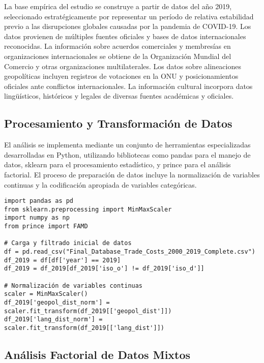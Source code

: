 \documentclass[11pt,a4paper]{article}
\begin{document}
La base empírica del estudio se construye a partir de datos del año 2019, seleccionado estratégicamente por representar un período de relativa estabilidad previo a las disrupciones globales causadas por la pandemia de COVID-19. Los datos provienen de múltiples fuentes oficiales y bases de datos internacionales reconocidas. La información sobre acuerdos comerciales y membresías en organizaciones internacionales se obtiene de la Organización Mundial del Comercio y otras organizaciones multilaterales. Los datos sobre alineaciones geopolíticas incluyen registros de votaciones en la ONU y posicionamientos oficiales ante conflictos internacionales. La información cultural incorpora datos lingüísticos, históricos y legales de diversas fuentes académicas y oficiales.

\subsection{Procesamiento y Transformación de Datos}

El análisis se implementa mediante un conjunto de herramientas especializadas desarrolladas en Python, utilizando bibliotecas como pandas para el manejo de datos, sklearn para el procesamiento estadístico, y prince para el análisis factorial. El proceso de preparación de datos incluye la normalización de variables continuas y la codificación apropiada de variables categóricas.

\begin{tcolorbox}[colback=codebackground,title=Procesamiento Inicial]
\begin{lstlisting}
import pandas as pd
from sklearn.preprocessing import MinMaxScaler
import numpy as np
from prince import FAMD

# Carga y filtrado inicial de datos
df = pd.read_csv("Final_Database_Trade_Costs_2000_2019_Complete.csv")
df_2019 = df[df['year'] == 2019]
df_2019 = df_2019[df_2019['iso_o'] != df_2019['iso_d']]

# Normalización de variables continuas
scaler = MinMaxScaler()
df_2019['geopol_dist_norm'] = scaler.fit_transform(df_2019[['geopol_dist']])
df_2019['lang_dist_norm'] = scaler.fit_transform(df_2019[['lang_dist']])
\end{lstlisting}
\end{tcolorbox}

\subsection{Análisis Factorial de Datos Mixtos}
\end{document}
